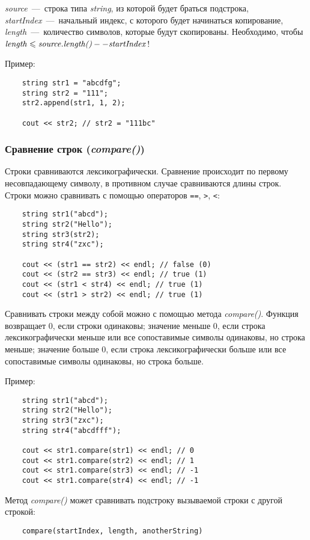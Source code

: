 \textit{source}~---~строка типа \textit{string}, из которой будет браться подстрока, \textit{startIndex}~---~начальный индекс, с которого будет начинаться копирование, \textit{length}~---~количество символов, которые будут скопированы. Необходимо, чтобы $\text{\textit{length}} \leqslant \text{\textit{source.length()}} - - \text{\textit{startIndex}}$! 

Пример:
\begin{lstlisting}
    string str1 = "abcdfg";
    string str2 = "111";
    str2.append(str1, 1, 2);
    
    cout << str2; // str2 = "111bc"
\end{lstlisting}

\subsubsection{Сравнение строк (\textit{compare()})}
Строки сравниваются лексикографически. Сравнение происходит по первому несовпадающему символу, в противном случае сравниваются длины строк.
Строки можно сравнивать с помощью операторов \lstinline{==}, \lstinline{>}, \lstinline{<}:
\begin{lstlisting}
    string str1("abcd");
    string str2("Hello");
    string str3(str2);
    string str4("zxc");
    
    cout << (str1 == str2) << endl; // false (0)
    cout << (str2 == str3) << endl; // true (1)
    cout << (str1 < str4) << endl; // true (1)
    cout << (str1 > str2) << endl; // true (1)
\end{lstlisting}

Сравнивать строки между собой можно с помощью метода \textit{compare()}. Функция возвращает 0, если строки одинаковы; значение меньше 0, если строка лексикографически меньше или все сопоставимые символы одинаковы, но строка меньше; значение больше 0, если строка лексикографически больше или все сопоставимые символы одинаковы, но строка больше.

Пример:

\begin{lstlisting}
    string str1("abcd");
    string str2("Hello");
    string str3("zxc");
    string str4("abcdfff");
    
    cout << str1.compare(str1) << endl; // 0
    cout << str1.compare(str2) << endl; // 1
    cout << str1.compare(str3) << endl; // -1
    cout << str1.compare(str4) << endl; // -1
\end{lstlisting}

Метод \textit{compare()} может сравнивать подстроку вызываемой строки с другой строкой:
\begin{lstlisting}
    compare(startIndex, length, anotherString)
\end{lstlisting}

